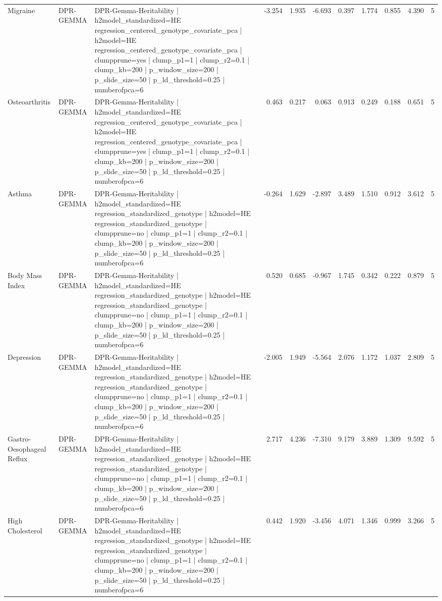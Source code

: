 \begin{landscape}
\begin{longtable}{p{2.4cm}p{1.8cm}p{6.0cm}rrrrrrrr}
Migraine & DPR-GEMMA & DPR-Gemma-Heritability | h2model\_standardized=HE regression\_centered\_genotype\_covariate\_pca | h2model=HE regression\_centered\_genotype\_covariate\_pca | clumpprune=yes | clump\_p1=1 | clump\_r2=0.1 | clump\_kb=200 | p\_window\_size=200 | p\_slide\_size=50 | p\_ld\_threshold=0.25 | numberofpca=6 & -3.254 & 1.935 & -6.693 & 0.397 & 1.774 & 0.855 & 4.390 & 5 \\
Osteoarthritis & DPR-GEMMA & DPR-Gemma-Heritability | h2model\_standardized=HE regression\_centered\_genotype\_covariate\_pca | h2model=HE regression\_centered\_genotype\_covariate\_pca | clumpprune=yes | clump\_p1=1 | clump\_r2=0.1 | clump\_kb=200 | p\_window\_size=200 | p\_slide\_size=50 | p\_ld\_threshold=0.25 | numberofpca=6 & 0.463 & 0.217 & 0.063 & 0.913 & 0.249 & 0.188 & 0.651 & 5 \\
Asthma & DPR-GEMMA & DPR-Gemma-Heritability | h2model\_standardized=HE regression\_standardized\_genotype | h2model=HE regression\_standardized\_genotype | clumpprune=no | clump\_p1=1 | clump\_r2=0.1 | clump\_kb=200 | p\_window\_size=200 | p\_slide\_size=50 | p\_ld\_threshold=0.25 | numberofpca=6 & -0.264 & 1.629 & -2.897 & 3.489 & 1.510 & 0.912 & 3.612 & 5 \\
Body Mass Index & DPR-GEMMA & DPR-Gemma-Heritability | h2model\_standardized=HE regression\_standardized\_genotype | h2model=HE regression\_standardized\_genotype | clumpprune=no | clump\_p1=1 | clump\_r2=0.1 | clump\_kb=200 | p\_window\_size=200 | p\_slide\_size=50 | p\_ld\_threshold=0.25 | numberofpca=6 & 0.520 & 0.685 & -0.967 & 1.745 & 0.342 & 0.222 & 0.879 & 5 \\
Depression & DPR-GEMMA & DPR-Gemma-Heritability | h2model\_standardized=HE regression\_standardized\_genotype | h2model=HE regression\_standardized\_genotype | clumpprune=no | clump\_p1=1 | clump\_r2=0.1 | clump\_kb=200 | p\_window\_size=200 | p\_slide\_size=50 | p\_ld\_threshold=0.25 | numberofpca=6 & -2.005 & 1.949 & -5.564 & 2.076 & 1.172 & 1.037 & 2.809 & 5 \\
Gastro-Oesophageal Reflux & DPR-GEMMA & DPR-Gemma-Heritability | h2model\_standardized=HE regression\_standardized\_genotype | h2model=HE regression\_standardized\_genotype | clumpprune=no | clump\_p1=1 | clump\_r2=0.1 | clump\_kb=200 | p\_window\_size=200 | p\_slide\_size=50 | p\_ld\_threshold=0.25 | numberofpca=6 & 2.717 & 4.236 & -7.310 & 9.179 & 3.889 & 1.309 & 9.592 & 5 \\
High Cholesterol & DPR-GEMMA & DPR-Gemma-Heritability | h2model\_standardized=HE regression\_standardized\_genotype | h2model=HE regression\_standardized\_genotype | clumpprune=no | clump\_p1=1 | clump\_r2=0.1 | clump\_kb=200 | p\_window\_size=200 | p\_slide\_size=50 | p\_ld\_threshold=0.25 | numberofpca=6 & 0.442 & 1.920 & -3.456 & 4.071 & 1.346 & 0.999 & 3.266 & 5 \\

\end{longtable}
\end{landscape}
